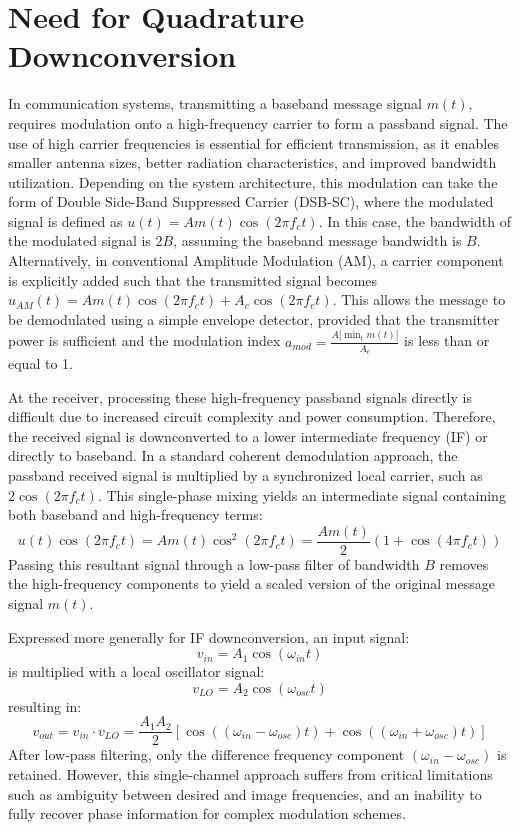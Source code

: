 \documentclass[conference]{IEEEtran}
\begin{document}
\section{Need for Quadrature Downconversion}

In communication systems, transmitting a baseband message signal $m(t)$, requires modulation onto a high-frequency carrier to form a passband signal. The use of high carrier frequencies is essential for efficient transmission, as it enables smaller antenna sizes, better radiation characteristics, and improved bandwidth utilization. Depending on the system architecture, this modulation can take the form of Double Side-Band Suppressed Carrier (DSB-SC), where the modulated signal is defined as $u(t) = Am(t)\cos(2\pi f_c t)$. In this case, the bandwidth of the modulated signal is $2B$, assuming the baseband message bandwidth is $B$. Alternatively, in conventional Amplitude Modulation (AM), a carrier component is explicitly added such that the transmitted signal becomes $u_{AM}(t) = Am(t)\cos(2\pi f_c t) + A_c\cos(2\pi f_c t)$. This allows the message to be demodulated using a simple envelope detector, provided that the transmitter power is sufficient and the modulation index $a_{mod} = \frac{A|\min_t m(t)|}{A_c}$ is less than or equal to 1.

At the receiver, processing these high-frequency passband signals directly is difficult due to increased circuit complexity and power consumption. Therefore, the received signal is downconverted to a lower intermediate frequency (IF) or directly to baseband. In a standard coherent demodulation approach, the passband received signal is multiplied by a synchronized local carrier, such as $2\cos(2\pi f_c t)$. This single-phase mixing yields an intermediate signal containing both baseband and high-frequency terms:
\[
u(t)\cos(2\pi f_c t) = Am(t)\cos^2(2\pi f_c t) = \frac{Am(t)}{2}(1 + \cos(4\pi f_c t))
\]
Passing this resultant signal through a low-pass filter of bandwidth $B$ removes the high-frequency components to yield a scaled version of the original message signal $m(t)$.

Expressed more generally for IF downconversion, an input signal:
\[
v_{in} = A_1 \cos(\omega_{in} t)
\]
is multiplied with a local oscillator signal:
\[
v_{LO} = A_2 \cos(\omega_{osc} t)
\]
resulting in:
\[
v_{out} = v_{in} \cdot v_{LO} = \frac{A_1 A_2}{2} \left[ \cos((\omega_{in} - \omega_{osc})t) + \cos((\omega_{in} + \omega_{osc})t) \right]
\]
After low-pass filtering, only the difference frequency component $(\omega_{in} - \omega_{osc})$ is retained. However, this single-channel approach suffers from critical limitations such as ambiguity between desired and image frequencies, and an inability to fully recover phase information for complex modulation schemes.
\end{document}
